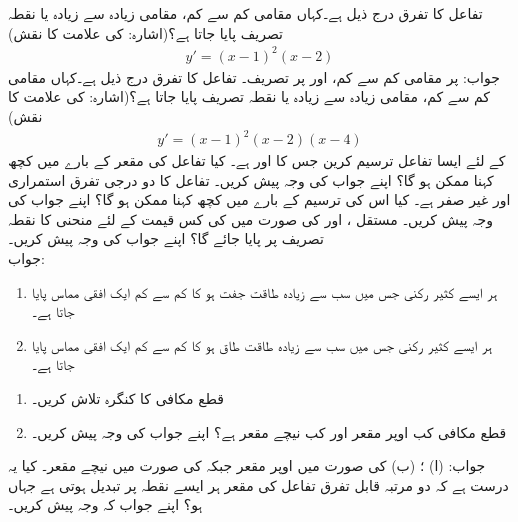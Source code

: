 تفاعل  کا تفرق درج ذیل ہے۔کہاں مقامی کم سے کم، مقامی زیادہ سے زیادہ یا  نقطہ تصریف پایا جاتا ہے؟(اشارہ:  کی علامت کا نقش) 
\begin{align*}
y'=(x-1)^2(x-2)
\end{align*}
جواب:\quad
{} پر مقامی کم سے کم،  اور  پر تصریف۔
تفاعل  کا تفرق درج ذیل ہے۔کہاں مقامی کم سے کم، مقامی زیادہ سے زیادہ یا  نقطہ تصریف پایا جاتا ہے؟(اشارہ:  کی علامت کا نقش) 
\begin{align*}
y'=(x-1)^2(x-2)(x-4)
\end{align*}
 کے لئے ایسا تفاعل  ترسیم کرین جس کا  اور  ہے۔ کیا تفاعل کی مقعر کے بارے میں کچھ کہنا ممکن ہو گا؟ اپنے جواب کی وجہ پیش کریں۔
تفاعل  کا دو درجی تفرق استمراری اور غیر صفر ہے۔ کیا اس کی ترسیم کے بارے میں کچھ کہنا ممکن ہو گا؟ اپنے جواب کی وجہ پیش کریں۔
مستقل ،  اور  کی صورت میں  کی کس قیمت کے لئے منحنی  کا نقطہ تصریف  پر پایا جائے گا؟ اپنے جواب کی وجہ پیش کریں۔\\
جواب:\quad
{}
\begin{enumerate}
\item
ہر ایسے کثیر رکنی جس میں سب سے زیادہ طاقت جفت ہو  کا کم سے کم ایک افقی مماس پایا جاتا ہے۔
\item
ہر ایسے کثیر رکنی جس میں سب سے زیادہ طاقت طاق ہو  کا کم سے کم ایک افقی مماس پایا جاتا ہے۔
\end{enumerate}
\begin{enumerate}
\item
قطع مکافی  کا کنگرہ تلاش کریں۔
\item
قطع مکافی کب اوپر مقعر اور کب  نیچے مقعر ہے؟ اپنے جواب کی وجہ پیش کریں۔
\end{enumerate}
جواب:\quad
(ا) ؛ (ب)  کی صورت میں اوپر مقعر جبکہ  کی صورت میں نیچے مقعر۔
کیا یہ درست ہے کہ دو مرتبہ قابل تفرق تفاعل  کی مقعر ہر ایسے نقطہ پر تبدیل ہوتی ہے جہاں  ہو؟ اپنے جواب کہ وجہ پیش کریں۔
